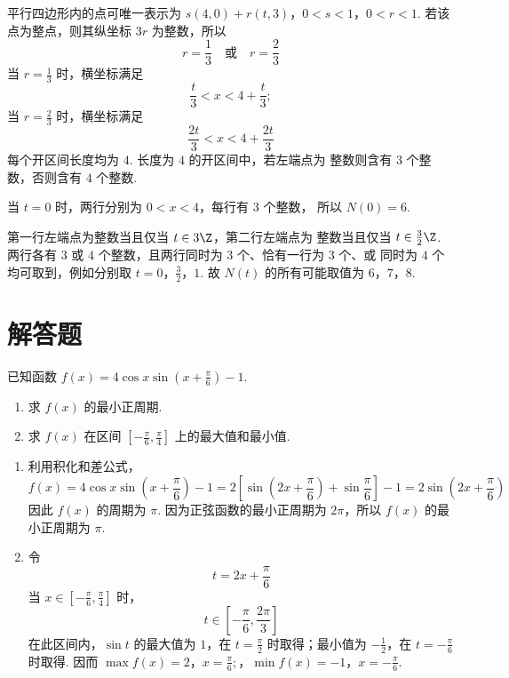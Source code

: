 \begin{solution}
平行四边形内的点可唯一表示为
\(s(4,0)+r(t,3)\)，\(0<s<1\)，\(0<r<1\).
若该点为整点，则其纵坐标 \(3r\) 为整数，所以
\[
r=\frac{1}{3}\quad\text{或}\quad r=\frac{2}{3}
\]
当 \(r=\frac{1}{3}\) 时，横坐标满足
\[
\frac{t}{3}<x<4+\frac{t}{3};
\]
当 \(r=\frac{2}{3}\) 时，横坐标满足
\[
\frac{2t}{3}<x<4+\frac{2t}{3}
\]
每个开区间长度均为 \(4\). 长度为 \(4\) 的开区间中，若左端点为
整数则含有 \(3\) 个整数，否则含有 \(4\) 个整数.

当 \(t=0\) 时，两行分别为 \(0<x<4\)，每行有 \(3\) 个整数，
所以 \(N(0)=6\).

第一行左端点为整数当且仅当 \(t\in3\Z\)，第二行左端点为
整数当且仅当 \(t\in\frac{3}{2}\Z\). 两行各有 \(3\) 或
\(4\) 个整数，且两行同时为 \(3\) 个、恰有一行为 \(3\) 个、或
同时为 \(4\) 个均可取到，例如分别取 \(t=0\)，\(\frac{3}{2}\)，\(1\).
故 \(N(t)\) 的所有可能取值为 \(6\)，\(7\)，\(8\).
\end{solution}

\section{解答题}

\begin{problem}
已知函数 \( f(x) = 4\cos x\sin \left(x + \frac{\pi}{6}\right) - 1 \).
\begin{enumerate}
\item 求 \( f(x) \) 的最小正周期.
\item 求 \( f(x) \) 在区间 \( \left[-\frac{\pi}{6}, \frac{\pi}{4}\right] \) 上的最大值和最小值.
\end{enumerate}
\end{problem}

\begin{solution}
\begin{enumerate}
\item 利用积化和差公式，
\[
f(x)=4\cos x\sin\left(x+\frac{\pi}{6}\right)-1
=2\left[\sin\left(2x+\frac{\pi}{6}\right)+\sin\frac{\pi}{6}\right]-1
=2\sin\left(2x+\frac{\pi}{6}\right)
\]
因此 \(f(x)\) 的周期为 \(\pi\). 因为正弦函数的最小正周期为
\(2\pi\)，所以 \(f(x)\) 的最小正周期为 \(\pi\).
\item 令
\[
t=2x+\frac{\pi}{6}
\]
当 \(x\in\left[-\frac{\pi}{6},\frac{\pi}{4}\right]\) 时，
\[
t\in\left[-\frac{\pi}{6},\frac{2\pi}{3}\right]
\]
在此区间内，\(\sin t\) 的最大值为 \(1\)，在 \(t=\frac{\pi}{2}\)
时取得；最小值为 \(-\frac{1}{2}\)，在 \(t=-\frac{\pi}{6}\)
时取得. 因而
\(\max f(x)=2\)，\(x=\frac{\pi}{6};\)，\(\min f(x)=-1\)，\(x=-\frac{\pi}{6}\).
\end{enumerate}
\end{solution}

